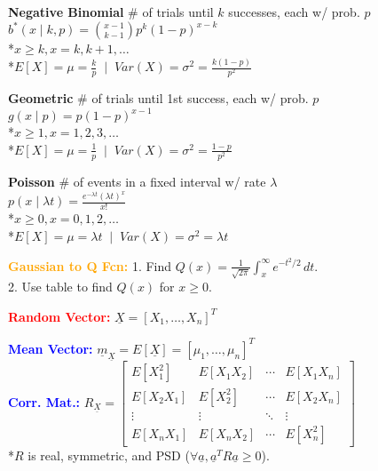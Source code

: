 \documentclass[5pt]{extarticle} %
\begin{document}
\begin{paracol}{3}
{    \textbf{Negative Binomial} \# of trials until $k$ successes, each w/ prob. $p$ \\
    $ b^*(x \mid k, p) = \binom{x-1}{k-1} p^k (1 - p)^{x - k}$ \\
    *$x \geq k, x = k, k+1, \dots $ \\
    *$ E[X] = \mu = \frac{k}{p} \; \mid \; Var(X) = \sigma^2 = \frac{k(1 - p)}{p^2} $

    \textbf{Geometric} \# of trials until 1st success, each w/ prob. $p$ \\
    $ g(x \mid p) = p(1 - p)^{x - 1}$ \\
    *$x \geq 1, x = 1, 2, 3, \dots $ \\
    *$ E[X] = \mu = \frac{1}{p} \; \mid \; Var(X) = \sigma^2 = \frac{1 - p}{p^2} $

    \textbf{Poisson} \# of events in a fixed interval w/ rate $\lambda$ \\
    $ p(x \mid \lambda t) = \frac{e^{-\lambda t} (\lambda t)^x}{x!}$ \\
    *$x \geq 0, x = 0, 1, 2, \dots $ \\
    *$ E[X] = \mu = \lambda t \; \mid \; Var(X) = \sigma^2 = \lambda t $

    \textcolor{orange}{\textbf{Gaussian to Q Fcn:}} 1. Find $Q(x) = \frac{1}{\sqrt{2\pi}} \int_x^\infty e^{-t^2/2} \, dt$. \\
    2. Use table to find $Q(x)$ for $x \geq 0$. 

    \textcolor{red}{\textbf{Random Vector:}} $\underline{X} = [X_1,\ldots,X_n]^T$ 

    \textcolor{blue}{\textbf{Mean Vector:}} $\underline{m}_{\underline{X}} = E[\underline{X}] = [\mu_1, \ldots, \mu_n]^T$ \\

    \textcolor{blue}{\textbf{Corr. Mat.:}} $R_{\underline{X}} =
    \begin{bmatrix}
    E[X_1^2] & E[X_1 X_2] & \cdots & E[X_1 X_n] \\
    E[X_2 X_1] & E[X_2^2] & \cdots & E[X_2 X_n] \\
    \vdots & \vdots & \ddots & \vdots \\
    E[X_n X_1] & E[X_n X_2] & \cdots & E[X_n^2]
    \end{bmatrix}$ \\
    *$R$ is real, symmetric, and PSD ($\forall \underline{a}, \underline{a}^T R \underline{a} \geq 0$).

}
\end{paracol}
\end{document}
